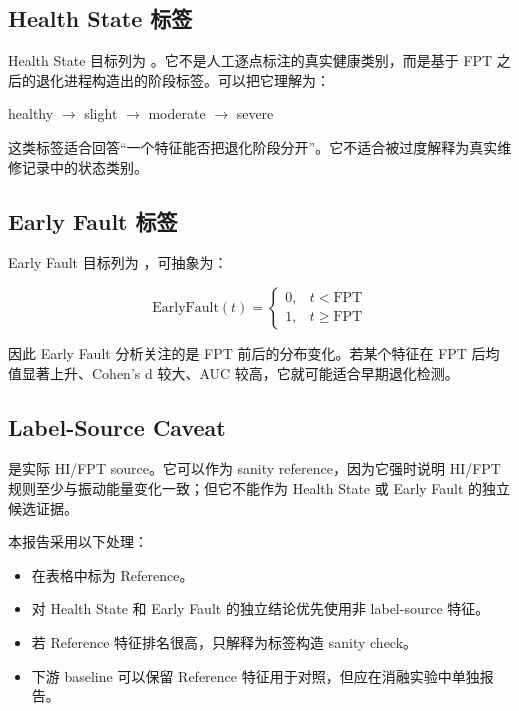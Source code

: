 \subsection{Health State 标签}

Health State 目标列为 。它不是人工逐点标注的真实健康类别，而是基于 FPT 之后的退化进程构造出的阶段标签。可以把它理解为：

\begin{center}
healthy \(\rightarrow\) slight \(\rightarrow\) moderate \(\rightarrow\) severe
\end{center}

这类标签适合回答“一个特征能否把退化阶段分开”。它不适合被过度解释为真实维修记录中的状态类别。

\subsection{Early Fault 标签}

Early Fault 目标列为 ，可抽象为：

\[
\mathrm{EarlyFault}(t)=
\begin{cases}
0, & t < \mathrm{FPT}\\
1, & t \geq \mathrm{FPT}
\end{cases}
\]

因此 Early Fault 分析关注的是 FPT 前后的分布变化。若某个特征在 FPT 后均值显著上升、Cohen's d 较大、AUC 较高，它就可能适合早期退化检测。

\subsection{Label-Source Caveat}

 是实际 HI/FPT source。它可以作为 sanity reference，因为它强时说明 HI/FPT 规则至少与振动能量变化一致；但它不能作为 Health State 或 Early Fault 的独立候选证据。

本报告采用以下处理：

\begin{itemize}[leftmargin=2em]
  \item {} 在表格中标为 Reference。
  \item 对 Health State 和 Early Fault 的独立结论优先使用非 label-source 特征。
  \item 若 Reference 特征排名很高，只解释为标签构造 sanity check。
  \item 下游 baseline 可以保留 Reference 特征用于对照，但应在消融实验中单独报告。
\end{itemize}
